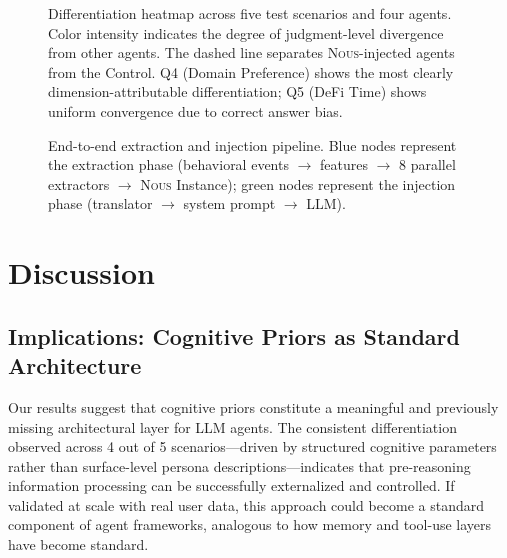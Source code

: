 \documentclass[11pt]{article}
\newcommand{\nous}{\textsc{Nous}}
\begin{document}
\begin{figure}[t]
    \centering
    \resizebox{0.85\textwidth}{!}{}
    \caption{Differentiation heatmap across five test scenarios and four agents. Color intensity indicates the degree of judgment-level divergence from other agents. The dashed line separates \nous{}-injected agents from the Control. Q4 (Domain Preference) shows the most clearly dimension-attributable differentiation; Q5 (DeFi Time) shows uniform convergence due to correct answer bias.}
    \label{fig:results}
\end{figure}


\begin{figure}[t]
    \centering
    \resizebox{\textwidth}{!}{}
    \caption{End-to-end extraction and injection pipeline. Blue nodes represent the extraction phase (behavioral events $\to$ features $\to$ 8 parallel extractors $\to$ \nous{} Instance); green nodes represent the injection phase (translator $\to$ system prompt $\to$ LLM).}
    \label{fig:pipeline}
\end{figure}


\section{Discussion}
\label{sec:discussion}

\subsection{Implications: Cognitive Priors as Standard Architecture}

Our results suggest that cognitive priors constitute a meaningful and previously missing architectural layer for LLM agents. The consistent differentiation observed across 4 out of 5 scenarios---driven by structured cognitive parameters rather than surface-level persona descriptions---indicates that pre-reasoning information processing can be successfully externalized and controlled. If validated at scale with real user data, this approach could become a standard component of agent frameworks, analogous to how memory and tool-use layers have become standard.
\end{document}
